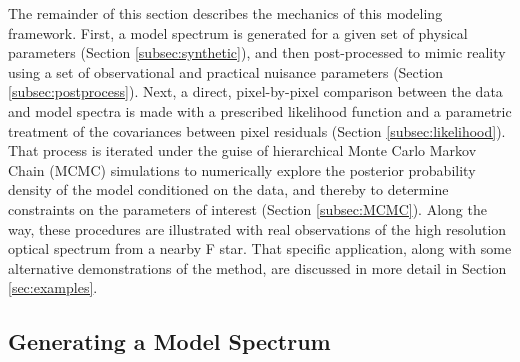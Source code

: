 \documentclass[iop,floatfix]{emulateapj}
\begin{document}
The remainder of this section describes the mechanics of this modeling framework.  First, a model 
spectrum is generated for a given set of physical parameters (Section \ref{subsec:synthetic}), and 
then post-processed to mimic reality using a set of observational and practical nuisance parameters 
(Section \ref{subsec:postprocess}).  Next, a direct, pixel-by-pixel comparison between the data and 
model spectra is made with a prescribed likelihood function and a parametric treatment of the 
covariances between pixel residuals (Section \ref{subsec:likelihood}).  That process is iterated 
under the guise of hierarchical Monte Carlo Markov Chain (MCMC) simulations to numerically explore 
the posterior probability density of the model conditioned on the data, and thereby to determine 
constraints on the parameters of interest (Section \ref{subsec:MCMC}).  Along the way, these 
procedures are illustrated with real observations of the high resolution optical spectrum from a 
nearby F star.  That specific application, along with some alternative demonstrations of the 
method, are discussed in more detail in Section \ref{sec:examples}.


\subsection{Generating a Model Spectrum \label{subsec:synthetic}}
\end{document}
